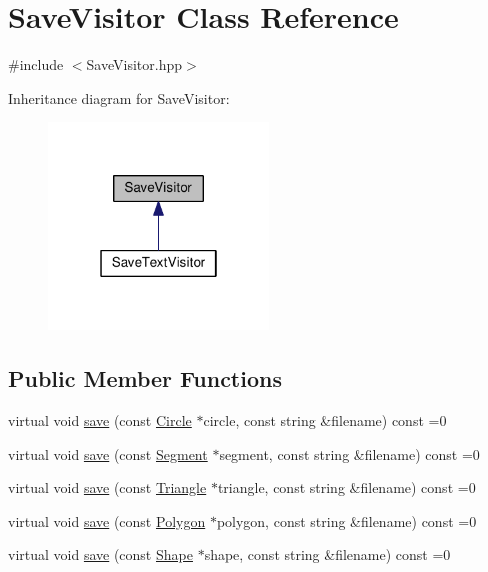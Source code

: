 \hypertarget{class_save_visitor}{}\section{Save\+Visitor Class Reference}
\label{class_save_visitor}


{\ttfamily \#include $<$Save\+Visitor.\+hpp$>$}



Inheritance diagram for Save\+Visitor\+:\nopagebreak
\begin{figure}[H]
\begin{center}
\leavevmode
\includegraphics[width=166pt]{class_save_visitor__inherit__graph}
\end{center}
\end{figure}
\subsection*{Public Member Functions}
\begin{DoxyCompactItemize}
\item 
virtual void \hyperlink{class_save_visitor_a2e17acabc377913b745edb2b391052c7}{save} (const \hyperlink{class_circle}{Circle} $\ast$circle, const string \&filename) const =0
\item 
virtual void \hyperlink{class_save_visitor_ad23764257a2a9836cb920be85ecbcd64}{save} (const \hyperlink{class_segment}{Segment} $\ast$segment, const string \&filename) const =0
\item 
virtual void \hyperlink{class_save_visitor_aa94777a1d367e937294ffd467835dc31}{save} (const \hyperlink{class_triangle}{Triangle} $\ast$triangle, const string \&filename) const =0
\item 
virtual void \hyperlink{class_save_visitor_aa24d8ccd081233a49ad31396e265af81}{save} (const \hyperlink{class_polygon}{Polygon} $\ast$polygon, const string \&filename) const =0
\item 
virtual void \hyperlink{class_save_visitor_a0d6549287b18302461912fe454a08af2}{save} (const \hyperlink{class_shape}{Shape} $\ast$shape, const string \&filename) const =0
\end{DoxyCompactItemize}


